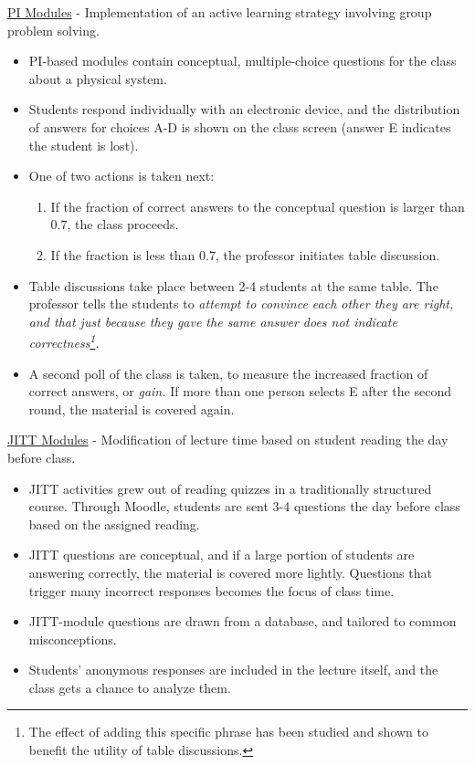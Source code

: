 \documentclass[../../../main.tex]{subfiles}
\begin{document}
\underline{PI Modules} - Implementation of an active learning strategy involving group problem solving.
\begin{itemize}
\item PI-based modules contain conceptual, multiple-choice questions for the class about a physical system.  
\item Students respond individually with an electronic device, and the distribution of answers for choices A-D is shown on the class screen (answer E indicates the student is lost).
\item One of two actions is taken next:
\begin{enumerate}
\item If the fraction of correct answers to the conceptual question is larger than 0.7, the class proceeds.
\item If the fraction is less than 0.7, the professor initiates table discussion.
\end{enumerate}
\item Table discussions take place between 2-4 students at the same table.  The professor tells the students to \textit{attempt to convince each other they are right, and that just because they gave the same answer does not indicate correctness\footnote{The effect of adding this specific phrase has been studied and shown to benefit the utility of table discussions.}.}
\item A second poll of the class is taken, to measure the increased fraction of correct answers, or \textit{gain.}  If more than one person selects E after the second round, the material is covered again.
\end{itemize}

\underline{JITT Modules} - Modification of lecture time based on student reading the day before class.
\begin{itemize}
\item JITT activities grew out of reading quizzes in a traditionally structured course.  Through Moodle, students are sent 3-4 questions the day before class based on the assigned reading.
\item JITT questions are conceptual, and if a large portion of students are answering correctly, the material is covered more lightly.  Questions that trigger many incorrect responses becomes the focus of class time.
\item JITT-module questions are drawn from a database, and tailored to common misconceptions.
\item Students' anonymous responses are included in the lecture itself, and the class gets a chance to analyze them.
\end{itemize}
\end{document}
